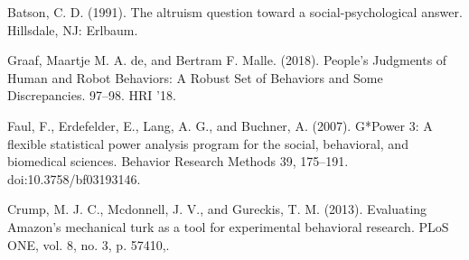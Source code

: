 \documentclass[runningheads]{llncs}
\begin{document}
\begin{thebibliography}{8}
Batson, C. D. (1991). The altruism question toward a social-psychological answer. Hillsdale, NJ: Erlbaum.


Graaf, Maartje M. A. de, and Bertram F. Malle. (2018). People’s Judgments of Human and Robot Behaviors: A Robust Set of Behaviors and Some Discrepancies. 97–98. HRI ’18.

Faul, F., Erdefelder, E., Lang, A. G., and Buchner, A. (2007). G*Power 3: A flexible statistical power analysis program for the social, behavioral, and biomedical sciences. Behavior Research Methods 39, 175–191. doi:10.3758/bf03193146.

Crump, M. J. C., Mcdonnell, J. V., and Gureckis, T. M. (2013). Evaluating Amazon's mechanical turk as a tool for experimental behavioral research. PLoS ONE, vol. 8, no. 3, p. 57410,.




\end{thebibliography}
\end{document}
